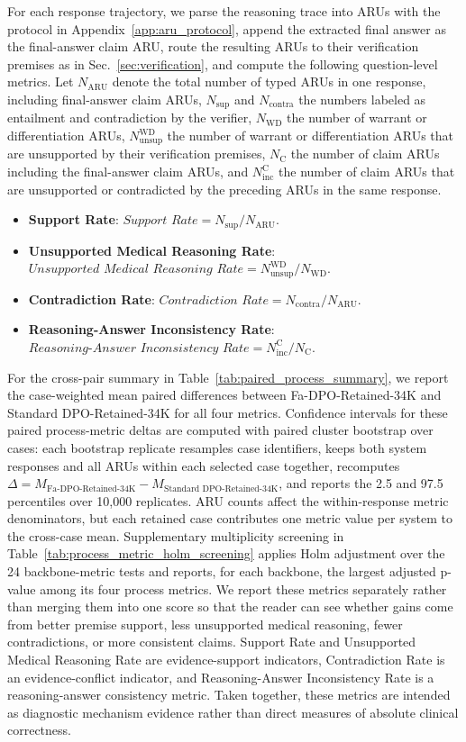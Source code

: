 \documentclass[a4paper,fleqn,doubleblind]{cas-sc}
\begin{document}
For each response trajectory, we parse the reasoning trace into ARUs with the protocol in Appendix~\ref{app:aru_protocol}, append the extracted final answer as the final-answer claim ARU, route the resulting ARUs to their verification premises as in Sec.~\ref{sec:verification}, and compute the following question-level metrics. Let $N_{\text{ARU}}$ denote the total number of typed ARUs in one response, including final-answer claim ARUs, $N_{\text{sup}}$ and $N_{\text{contra}}$ the numbers labeled as entailment and contradiction by the verifier, $N_{\text{WD}}$ the number of warrant or differentiation ARUs, $N_{\text{unsup}}^{\text{WD}}$ the number of warrant or differentiation ARUs that are unsupported by their verification premises, $N_{\text{C}}$ the number of claim ARUs including the final-answer claim ARUs, and $N_{\text{inc}}^{\text{C}}$ the number of claim ARUs that are unsupported or contradicted by the preceding ARUs in the same response.
\begin{itemize}[leftmargin=*]
    \item \textbf{Support Rate}: $\textit{Support Rate} = N_{\text{sup}} / N_{\text{ARU}}$.
    \item \textbf{Unsupported Medical Reasoning Rate}: $\textit{Unsupported Medical Reasoning Rate} = N_{\text{unsup}}^{\text{WD}} / N_{\text{WD}}$.
    \item \textbf{Contradiction Rate}: $\textit{Contradiction Rate} = N_{\text{contra}} / N_{\text{ARU}}$.
    \item \textbf{Reasoning-Answer Inconsistency Rate}: $\textit{Reasoning-Answer Inconsistency Rate} = N_{\text{inc}}^{\text{C}} / N_{\text{C}}$.
\end{itemize}
For the cross-pair summary in Table~\ref{tab:paired_process_summary}, we report the case-weighted mean paired differences between Fa-DPO-Retained-34K and Standard DPO-Retained-34K for all four metrics. Confidence intervals for these paired process-metric deltas are computed with paired cluster bootstrap over cases: each bootstrap replicate resamples case identifiers, keeps both system responses and all ARUs within each selected case together, recomputes $\Delta = M_{\text{Fa-DPO-Retained-34K}} - M_{\text{Standard DPO-Retained-34K}}$, and reports the 2.5 and 97.5 percentiles over 10,000 replicates. ARU counts affect the within-response metric denominators, but each retained case contributes one metric value per system to the cross-case mean. Supplementary multiplicity screening in Table~\ref{tab:process_metric_holm_screening} applies Holm adjustment over the 24 backbone-metric tests and reports, for each backbone, the largest adjusted p-value among its four process metrics. We report these metrics separately rather than merging them into one score so that the reader can see whether gains come from better premise support, less unsupported medical reasoning, fewer contradictions, or more consistent claims. Support Rate and Unsupported Medical Reasoning Rate are evidence-support indicators, Contradiction Rate is an evidence-conflict indicator, and Reasoning-Answer Inconsistency Rate is a reasoning-answer consistency metric. Taken together, these metrics are intended as diagnostic mechanism evidence rather than direct measures of absolute clinical correctness.
\end{document}
